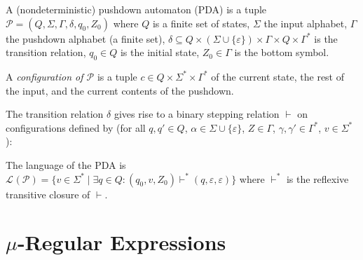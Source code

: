 \documentclass[runningheads, envcountsame, a4paper]{llncs}
\newcommand\Lang[1][{}]{\mathcal{L}^{#1}}
\begin{document}
\begin{definition}
  A (nondeterministic) pushdown automaton (PDA) is a tuple
  $\mathcal{P} = (Q, \Sigma, \Gamma, \delta, q_0, Z_0)$ where $Q$ is a
  finite set of states, $\Sigma$ the input alphabet, $\Gamma$ the
  pushdown alphabet (a finite set), $\delta \subseteq Q \times (\Sigma
  \cup \{\varepsilon\}) \times \Gamma \times Q \times \Gamma^* $ is
  the transition relation, $q_0
  \in Q$ is the initial state, $Z_0 \in \Gamma$ is the %
  bottom symbol.

  A \emph{configuration of $\mathcal{P} $} is a tuple $c \in Q \times
  \Sigma^* \times \Gamma^*$ of the current state, the rest of the
  input, and the current contents of the pushdown.

  The transition relation $\delta$ gives rise to a binary stepping relation
  $\vdash$ on configurations defined by (for all $q, q' \in Q$,
  $\alpha\in\Sigma\cup\{\varepsilon\}$, $Z\in\Gamma$, $\gamma,\gamma'
  \in \Gamma^*$, $v\in\Sigma^*$):
  \begin{mathpar}
  \end{mathpar}
  The language of the PDA is $\Lang (\mathcal{P}) = \{ v \in \Sigma^* \mid
  \exists q \in Q: (q_0, v,  Z_0) \vdash^*  (q, \varepsilon,
  \varepsilon) \}$ where $\vdash^*$ is the reflexive transitive
  closure of $\vdash$.
\end{definition}

\section{$\mu$-Regular Expressions}
\label{sec:mu-regul-expr}
\end{document}
